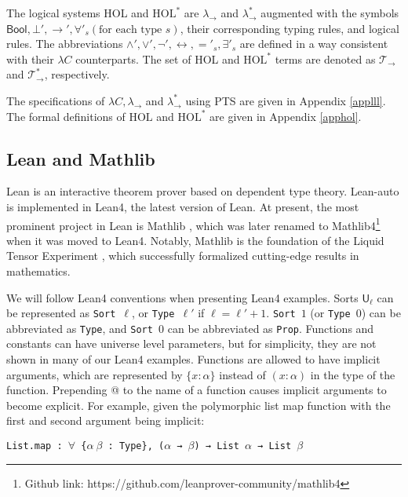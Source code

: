  The logical systems HOL and $\text{HOL}^*$ are $\lambda_\to$ and $\lambda_\to^*$ augmented
  with the symbols $\mathsf{Bool}, \bot', \to', \forall'_s(\text{for each type }s)$, their
  corresponding typing rules, and logical rules. The abbreviations $\land', \lor', \neg', \leftrightarrow, ='_s, \exists'_s$
  are defined in a way consistent with their $\lambda C$ counterparts.
  The set of HOL and $\text{HOL}^*$ terms are denoted as $\mathcal{T}_\to$ and $\mathcal{T}_\to^*$, respectively.

  The specifications of $\lambda C, \lambda_\to$ and $\lambda_\to^*$ using PTS are given in Appendix \ref{applll}.
  The formal definitions of $\text{HOL}$ and $\text{HOL}^*$ are given in Appendix \ref{apphol}.

\subsection{Lean and Mathlib}\label{sectlean}

  Lean is an interactive theorem prover based on dependent type theory. Lean-auto
  is implemented in Lean4, the latest version of Lean. At present, the
  most prominent project in Lean is Mathlib \cite{MathlibPaper},
  which was later renamed to Mathlib4\footnote{Github link: https://github.com/leanprover-community/mathlib4}
  when it was moved to Lean4. Notably, Mathlib is the foundation of the
  Liquid Tensor Experiment \cite{LiquidTensor}, which successfully
  formalized cutting-edge results in mathematics. 

  We will follow Lean4 conventions when presenting Lean4 examples. Sorts $\mathsf{U}_\ell$
  can be represented as \texttt{Sort $\ell$}, or \texttt{Type $\ell'$} if $\ell = \ell' + 1$.
  \texttt{Sort $1$} (or \texttt{Type $0$}) can be abbreviated as \texttt{Type},
  and \texttt{Sort $0$} can be abbreviated as \texttt{Prop}.
  Functions and constants can have universe level parameters, but for simplicity,
  they are not shown in many of our Lean4 examples. 
  Functions are allowed to have implicit arguments, which are represented by
  $\{x : \alpha\}$ instead of $(x : \alpha)$ in the type of the function.
  Prepending \textrm{@} to the name of a function causes implicit arguments
  to become explicit. For example, given the polymorphic list map function
  with the first and second argument being implicit:

  \centerline{\texttt{List.map : $\forall$ \{$\alpha \ \beta$ : Type\}, ($\alpha$ → $\beta$) → List $\alpha$ → List $\beta$}}
  
